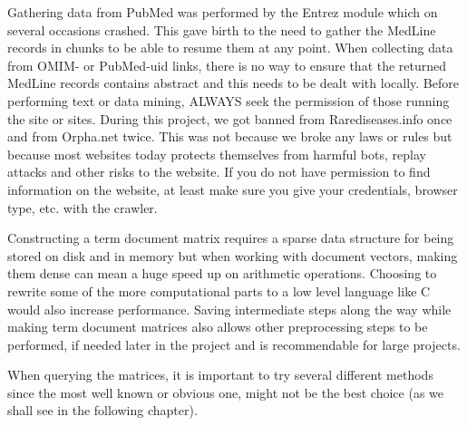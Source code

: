 Gathering data from PubMed was performed by the Entrez module which on
several occasions crashed. This gave birth to the need to gather the
MedLine records in chunks to be able to resume them at any point. When
collecting data from OMIM- or PubMed-uid links, there is no way to
ensure that the returned MedLine records contains abstract and this
needs to be dealt with locally. Before performing text or data mining,
ALWAYS seek the permission of those running the site or sites. During
this project, we got banned from Rarediseases.info once and from
Orpha.net twice. This was not because we broke any laws or rules but
because most websites today protects themselves from harmful bots,
replay attacks and other risks to the website. If you do not have
permission to find information on the website, at least make sure you
give your credentials, browser type, etc. with the crawler.

Constructing a term document matrix requires a sparse data structure
for being stored on disk and in memory but when working with document
vectors, making them dense can mean a huge speed up on arithmetic
operations. Choosing to rewrite some of the more computational parts
to a low level language like C would also increase performance. Saving
intermediate steps along the way while making term document matrices
also allows other preprocessing steps to be performed, if needed later
in the project and is recommendable for large projects.

When querying the matrices, it is important to try several different
methods since the most well known or obvious one, might not be the
best choice (as we shall see in the following chapter).
